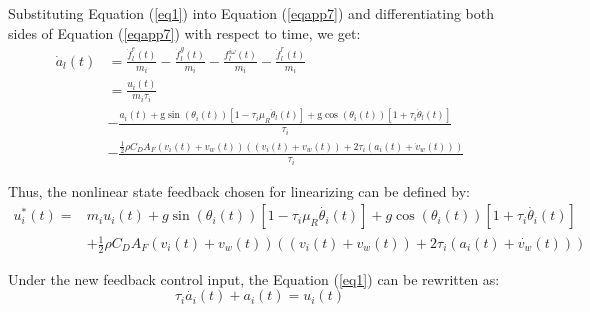 \documentclass[a4paper]{cas-sc}
\begin{document}
Substituting Equation (\ref{eq1}) into Equation (\ref{eqapp7}) and differentiating both sides of Equation (\ref{eqapp7}) with respect to time, we get:
\begin{equation}
  \begin{aligned}
    \dot{a}_{l}(t) & =\frac{\dot{f}_{l}^{e}(t)}{m_{i}}-\frac{\dot{f}_{l}^{g}(t)}{m_{i}}-\frac{f_{l}^{i \omega}(t)}{m_{i}}-\frac{\dot{f}_{l}^{r}(t)}{m_{i}}                                                                                         \\
                   & =               \frac{u_{i}(t)}{m_{i} \tau_{i}}                                                                                                                                                                               \\
                   & -               \frac{a_{i}(t)+\mathrm{g} \sin \left(\theta_{i}(t)\right)\left[1-\tau_{i} \mu_{R} \dot{\theta}_{l}(t)\right]+\mathrm{g} \cos \left(\theta_{i}(t)\right)\left[1+\tau_{i} \dot{\theta}_{l}(t)\right]}{\tau_{i}} \\
                   & -               \frac{\frac{1}{2} \rho C_{D} A_{F}\left(v_{i}(t)+v_{w}(t)\right)\left(\left(v_{i}(t)+v_{w}(t)\right)+2 \tau_{i}\left(a_{i}(t)+\dot{v}_{w}(t)\right)\right)}{\tau_{i}}
  \end{aligned}
  \label{eqapp8}
\end{equation}

Thus, the nonlinear state feedback chosen for linearizing can be defined by:
\begin{equation}
  \begin{aligned}
    u_i^\ast\left(t\right)= & m_iu_i\left(t\right)+g\sin{\left(\theta_i\left(t\right)\right)}\left[1-\tau_i\mu_R\dot{\theta_i}\left(t\right)\right]+g\cos{\left(\theta_i\left(t\right)\right)}\left[1+\tau_i\dot{\theta_i}\left(t\right)\right]\ \\
                            & +\frac{1}{2}\rho C_DA_F\left(v_i\left(t\right)+v_w\left(t\right)\right)\left(\left(v_i\left(t\right)+v_w\left(t\right)\right)+2\tau_i(a_i\left(t\right)+\dot{v_w}\left(t\right))\right)
  \end{aligned}
  \label{eqapp9}
\end{equation}

Under the new feedback control input, the Equation (\ref{eq1}) can be rewritten as:
\begin{equation}
  \tau_i\dot{a_i}\left(t\right)+a_i\left(t\right)=u_i(t)
  \label{eqapp10}
\end{equation}
\end{document}
